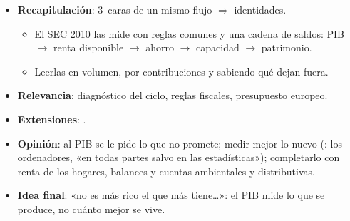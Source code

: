 \documentclass{article}
\begin{document}
\begin{columnas}
\begin{itemize}
\item \textbf{Recapitulación}: 3~caras de un mismo flujo $\Rightarrow$ identidades.
  \begin{itemize}
  \item El SEC 2010 las mide con reglas comunes y una cadena de saldos: PIB $\to$ renta disponible $\to$ ahorro $\to$ capacidad $\to$ patrimonio.
  \item Leerlas en volumen, por contribuciones y sabiendo qué dejan fuera.
  \end{itemize}
\item \textbf{Relevancia}: diagnóstico del ciclo, reglas fiscales, presupuesto europeo.
\item \textbf{Extensiones}:      .
\item \textbf{Opinión}: al PIB se le pide lo que no promete; medir mejor lo nuevo (: los ordenadores, «en todas partes salvo en las estadísticas»); completarlo con renta de los hogares, balances y cuentas ambientales y distributivas.
\item \textbf{Idea final}: «no es más rico el que más tiene…»: el PIB mide lo que se produce, no cuánto mejor se vive.
\end{itemize}


\end{columnas}
\end{document}
